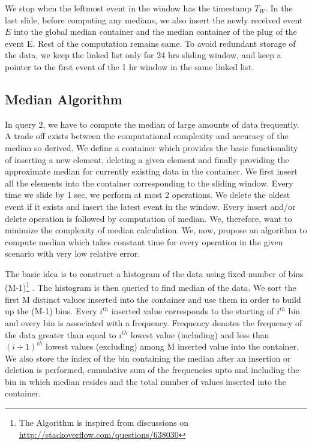 We stop when the leftmost event in the window has the timestamp $T_W$.
In the last slide, before computing any medians, we also insert the newly received event $E$ into the global median container and the median container of the plug of the event E.
Rest of the computation remains same.
To avoid redundant storage of the data, we keep the linked list only for 24 hrs sliding window, and keep a pointer to the first event of the 1 hr window in the same linked list.


\subsection{Median Algorithm}
In query 2, we have to compute the median of large amounts of data frequently.
A trade off exists between the computational complexity and accuracy of the median so derived.
We define a container which provides the basic functionality of inserting a new element, deleting a given element and finally providing the approximate median for currently existing data in the container.
We first insert all the elements into the container corresponding to the sliding window.
Every time we slide by 1 sec, we perform at most 2 operations.
We delete the oldest event if it exists and insert the latest event in the window.
Every insert and/or delete operation is followed by computation of median.
We, therefore, want to minimize the complexity of median calculation.
We, now, propose an algorithm to compute median which takes constant time for every operation in the given scenario with very low relative error.

The basic idea is to construct a histogram of the data using fixed number of bins (M-1)\footnote{The Algorithm is inspired from discussions on \url{http://stackoverflow.com/questions/638030}} .
The histogram is then queried to find median of the data.
We sort the first M distinct values inserted into the container and use them in order to build up the (M-1) bins.
Every $i^{th}$ inserted value corresponds to the starting of $i^{th}$ bin and every bin is associated with a frequency.
Frequency denotes the frequency of the data greater than equal to $i^{th}$ lowest value (including) and less than $(i+1)^{th}$ lowest values (excluding) among M inserted value into the container.
We also store the index of the bin containing the median after an insertion or deletion is performed, cumulative sum of the frequencies upto and including the bin in which median resides and the total number of values inserted into the container.

